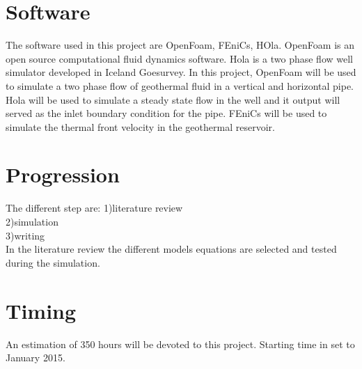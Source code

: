 \documentclass[
10pt, %
a4paper, %
oneside, %
headinclude,footinclude, %
BCOR5mm, %
]{scrartcl}
\begin{document}
\section{Software}
The software used in this project are OpenFoam, FEniCs, HOla. OpenFoam is an open source computational fluid dynamics software. Hola is a two phase flow well simulator developed in Iceland Goesurvey. 
In this project, OpenFoam will be used to simulate a two phase flow of geothermal fluid in a vertical and horizontal pipe. Hola will be used to simulate a steady state flow in the well and it output will served as the inlet boundary condition for the pipe. FEniCs will be used to simulate the thermal front velocity in the geothermal reservoir.

\section{Progression} 
The different step are:
1)literature review\\
2)simulation\\
3)writing\\

In the literature review the different models equations are selected and tested during the simulation.

\section{Timing}
An estimation of 350 hours will be devoted to this project. Starting time in set to January 2015.






\renewcommand{\refname}{\spacedlowsmallcaps{References}} %




\end{document}
